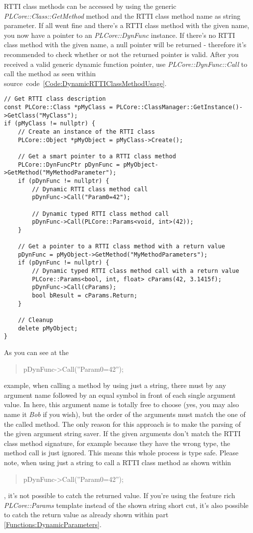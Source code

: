 \ac{RTTI} class methods can be accessed by using the generic \emph{PLCore::Class::GetMethod} method and the \ac{RTTI} class method name as string parameter. If all went fine and there's a \ac{RTTI} class method with the given name, you now have a pointer to an \emph{PLCore::DynFunc} instance. If there's no \ac{RTTI} class method with the given name, a null pointer will be returned - therefore it's recommended to check whether or not the returned pointer is valid. After you received a valid generic dynamic function pointer, use \emph{PLCore::DynFunc::Call} to call the method as seen within source~code~\ref{Code:DynamicRTTIClassMethodUsage}.
\begin{lstlisting}[label=Code:DynamicRTTIClassMethodUsage,caption={Dynamically calling \ac{RTTI} class methods}]
// Get RTTI class description
const PLCore::Class *pMyClass = PLCore::ClassManager::GetInstance()->GetClass("MyClass");
if (pMyClass != nullptr) {
	// Create an instance of the RTTI class
	PLCore::Object *pMyObject = pMyClass->Create();

	// Get a smart pointer to a RTTI class method
	PLCore::DynFuncPtr pDynFunc = pMyObject->GetMethod("MyMethodParameter");
	if (pDynFunc != nullptr) {
		// Dynamic RTTI class method call
		pDynFunc->Call("Param0=42");

		// Dynamic typed RTTI class method call
		pDynFunc->Call(PLCore::Params<void, int>(42));
	}

	// Get a pointer to a RTTI class method with a return value
	pDynFunc = pMyObject->GetMethod("MyMethodParameters");
	if (pDynFunc != nullptr) {
		// Dynamic typed RTTI class method call with a return value
		PLCore::Params<bool, int, float> cParams(42, 3.1415f);
		pDynFunc->Call(cParams);
		bool bResult = cParams.Return;
	}

	// Cleanup
	delete pMyObject;
}
\end{lstlisting}
As you can see at the \begin{quote}pDynFunc->Call(''Param0=42'');\end{quote} example, when calling a method by using just a string, there must by any argument name followed by an equal symbol in front of each single argument value. In here, this argument name is totally free to choose (yes, you may also name it \emph{Bob} if you wish), but the order of the arguments must match the one of the called method. The only reason for this approach is to make the parsing of the given argument string saver. If the given arguments don't match the \ac{RTTI} class method signature, for example because they have the wrong type, the method call is just ignored. This means this whole process is type safe. Please note, when using just a string to call a \ac{RTTI} class method as shown within \begin{quote}pDynFunc->Call(''Param0=42'');\end{quote}, it's not possible to catch the returned value. If you're using the feature rich \emph{PLCore::Params} template instead of the shown string short cut, it's also possible to catch the return value as already shown within part \ref{Functions:DynamicParameters}.

